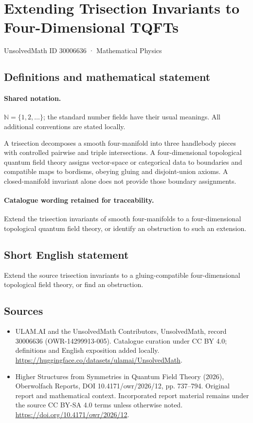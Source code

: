 \documentclass[11pt]{article}
\begin{document}
\setcounter{section}{30006635}
\section{Extending Trisection Invariants to Four-Dimensional TQFTs}\label{30006636}
{\small UnsolvedMath ID 30006636 · Mathematical Physics}
\subsection{Definitions and mathematical statement}

\paragraph{Shared notation.}$\mathbb N=\{1,2,\ldots\}$; the standard number fields have their usual meanings. All additional conventions are stated locally.


A trisection decomposes a smooth four-manifold into three handlebody pieces with controlled pairwise and triple intersections. A four-dimensional topological quantum field theory assigns vector-space or categorical data to boundaries and compatible maps to bordisms, obeying gluing and disjoint-union axioms. A closed-manifold invariant alone does not provide those boundary assignments.

\paragraph{Catalogue wording retained for traceability.}
Extend the trisection invariants of smooth four-manifolds to a four-dimensional topological quantum field theory, or identify an obstruction to such an extension.
\subsection{Short English statement}
Extend the source trisection invariants to a gluing-compatible four-dimensional topological field theory, or find an obstruction.
\subsection{Sources}
\begin{itemize}
\item[\hypertarget{source:30006636:1}{S1}] ULAM.AI and the UnsolvedMath Contributors, UnsolvedMath, record 30006636 (OWR-14299913-005). Catalogue curation under CC BY 4.0; definitions and English exposition added locally.
\url{https://huggingface.co/datasets/ulamai/UnsolvedMath}.
\item[\hypertarget{source:30006636:2}{S2}] Higher Structures from Symmetries in Quantum Field Theory (2026), Oberwolfach Reports, DOI 10.4171/owr/2026/12, pp. 737--794. Original report and mathematical context. Incorporated report material remains under the source CC BY-SA 4.0 terms unless otherwise noted.
\url{https://doi.org/10.4171/owr/2026/12}.
\end{itemize}
\label{end:30006636}
\end{document}
